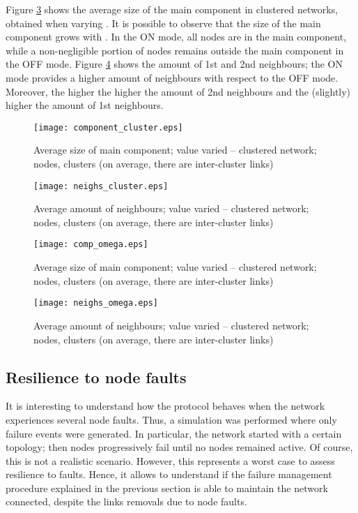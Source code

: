 \documentclass{www13-companion-accepted}
\begin{document}
Figure \ref{fig:comp_omega} shows the average size of the main component in clustered networks, obtained when varying . It is possible to observe that the size of the main component grows with . In the ON mode, all nodes are in the main component, while a non-negligible portion of nodes remains outside the main component in the OFF mode. Figure \ref{fig:neighs_omega} shows the amount of 1st and 2nd neighbours; the ON mode provides a higher amount of neighbours with respect to the OFF mode. 
Moreover, the higher  the higher the amount of 2nd neighbours and the (slightly) higher the amount of 1st neighbours. 

\begin{figure}[thbp]
   \centering
   \texttt{[image: component\_cluster.eps]}
\caption{Average size of main component;  value varied -- clustered network;  nodes,  clusters (on average, there are  inter-cluster links)}
   \label{fig:comp_cluster}
\end{figure}

\begin{figure}[thbp]
   \centering
   \texttt{[image: neighs\_cluster.eps]}
\caption{Average amount of neighbours;  value varied -- clustered network;  nodes,  clusters (on average, there are  inter-cluster links)}
   \label{fig:neighs_cluster}
\end{figure}

\begin{figure}[thbp]
   \centering
   \texttt{[image: comp\_omega.eps]}
\caption{Average size of main component;  value varied -- clustered network;  nodes,  clusters (on average, there are  inter-cluster links)}
   \label{fig:comp_omega}
\end{figure}

\begin{figure}[thbp]
   \centering
   \texttt{[image: neighs\_omega.eps]}
\caption{Average amount of neighbours;  value varied -- clustered network;  nodes,  clusters (on average, there are  inter-cluster links)}
   \label{fig:neighs_omega}
\end{figure}


\subsection{Resilience to node faults}

It is interesting to understand how the protocol behaves when the network experiences several node faults. Thus, a simulation was performed where only failure events were generated. In particular, the network started with a certain topology; then nodes progressively fail until no nodes remained active. 
Of course, this is not a realistic scenario. However, this represents a worst case to assess resilience to faults.
Hence, it allows to understand if the failure management procedure explained in the previous section is able to maintain the network connected, despite the links removals due to node faults.
\end{document}

